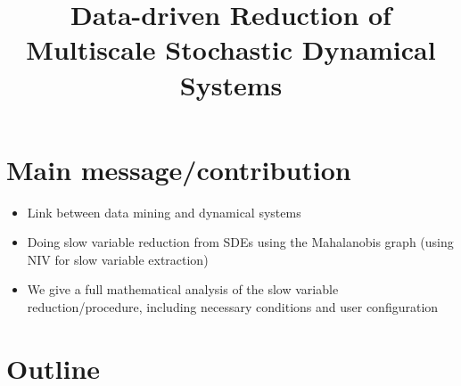 \documentclass[12pt]{article}
\title{Data-driven Reduction of Multiscale Stochastic Dynamical Systems }
\begin{document}
\maketitle


\section{Main message/contribution}

\begin{itemize}

\item Link between data mining and dynamical systems

\item Doing slow variable reduction from SDEs using the Mahalanobis graph (using NIV for slow variable extraction)

\item We give a full mathematical analysis of the slow variable reduction/procedure, including necessary conditions and user configuration

\end{itemize}



\section{Outline}
\end{document}
